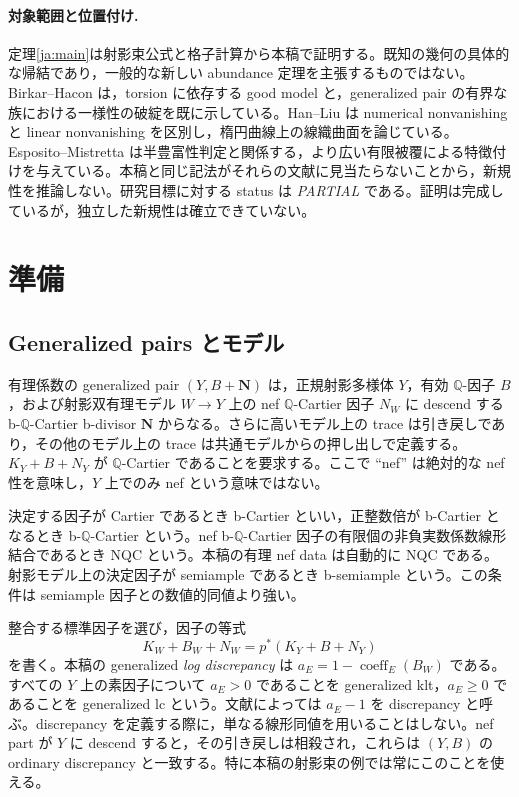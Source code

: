 \documentclass[12pt]{amsart}
\theoremstyle{definition}
\theoremstyle{remark}
\numberwithin{equation}{section}
\newcommand{\Q}{\mathbb{Q}}
\newcommand{\bN}{\mathbf N}
\begin{document}
\paragraph{対象範囲と位置付け.}
定理\ref{ja:main}は射影束公式と格子計算から本稿で証明する。既知の幾何の具体的な帰結であり，一般的な新しい abundance 定理を主張するものではない。Birkar--Hacon \cite[Example 1.1，Example 3.1 および \S4]{ja-BH} は，torsion に依存する good model と，generalized pair の有界な族における一様性の破綻を既に示している。Han--Liu \cite{ja-HL} は numerical nonvanishing と linear nonvanishing を区別し，楕円曲線上の線織曲面を論じている。Esposito--Mistretta \cite{ja-EM} は半豊富性判定と関係する，より広い有限被覆による特徴付けを与えている。本稿と同じ記法がそれらの文献に見当たらないことから，新規性を推論しない。研究目標に対する status は \emph{PARTIAL} である。証明は完成しているが，独立した新規性は確立できていない。

\section{準備}\label{ja:prelim}
\subsection{Generalized pairs とモデル}
有理係数の generalized pair $(Y,B+\bN)$ は，正規射影多様体 $Y$，有効 $\Q$-因子 $B$，および射影双有理モデル $W\to Y$ 上の nef $\Q$-Cartier 因子 $N_W$ に descend する b-$\Q$-Cartier b-divisor $\bN$ からなる。さらに高いモデル上の trace は引き戻しであり，その他のモデル上の trace は共通モデルからの押し出しで定義する。$K_Y+B+N_Y$ が $\Q$-Cartier であることを要求する。ここで ``nef'' は絶対的な nef 性を意味し，$Y$ 上でのみ nef という意味ではない。

決定する因子が Cartier であるとき b-Cartier といい，正整数倍が b-Cartier となるとき b-$\Q$-Cartier という。nef b-$\Q$-Cartier 因子の有限個の非負実数係数線形結合であるとき NQC という。本稿の有理 nef data は自動的に NQC である。射影モデル上の決定因子が semiample であるとき b-semiample という。この条件は semiample 因子との数値的同値より強い。

整合する標準因子を選び，因子の等式
\[
 K_W+B_W+N_W=p^*(K_Y+B+N_Y)
\]
を書く。本稿の generalized \emph{log discrepancy} は $a_E=1-\operatorname{coeff}_E(B_W)$ である。すべての $Y$ 上の素因子について $a_E>0$ であることを generalized klt，$a_E\geq0$ であることを generalized lc という。文献によっては $a_E-1$ を discrepancy と呼ぶ。discrepancy を定義する際に，単なる線形同値を用いることはしない。nef part が $Y$ に descend すると，その引き戻しは相殺され，これらは $(Y,B)$ の ordinary discrepancy と一致する。特に本稿の射影束の例では常にこのことを使える。
\end{document}
